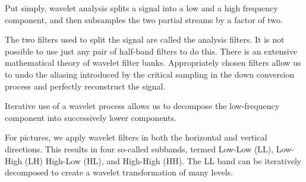 Put simply, wavelet analysis splits a signal into a low and a high
frequency component, and then subsamples the two partial streams by a
factor of two.

The two filters used to split the signal are called the analysis
filters. It is not possible to use just any pair of half-band filters to
do this. There is an extensive mathematical theory of wavelet filter
banks. Appropriately chosen filters allow us to undo the aliasing
introduced by the critical sampling in the down conversion process and
perfectly reconstruct the signal.

Iterative use of a wavelet process allows us to decompose the
low-frequency component into successively lower components.

For pictures, we apply wavelet filters in both the horizontal and
vertical directions. This results in four so-called subbands, termed
Low-Low (LL), Low-High (LH) High-Low (HL), and High-High (HH). The LL
band can be iteratively decomposed to create a wavelet transformation of
many levels.
